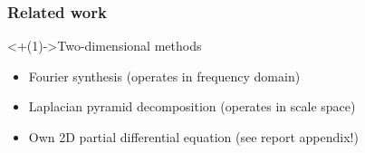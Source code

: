 
\begin{frame}[<+(1)->]
\frametitle{Related work}

\uncover<+(1)->{Two-dimensional methods}

\begin{itemize}
\item Fourier synthesis (operates in frequency domain)
\item Laplacian pyramid decomposition (operates in scale space)
\item Own 2D partial differential equation (see report appendix!)
\end{itemize}




\end{frame}